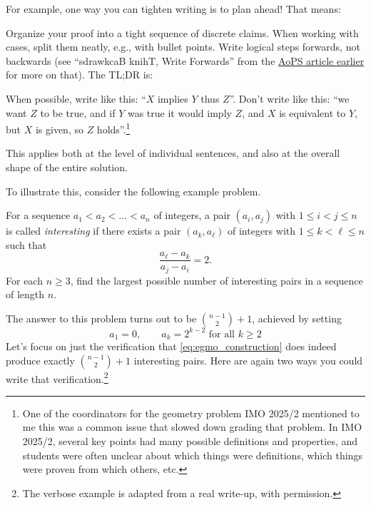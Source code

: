 \documentclass[11pt]{scrartcl}
\begin{document}
For example, one way you can tighten writing is to plan ahead! That means:
\begin{itemize}
  \ii Organize your proof into a tight sequence of discrete claims.
  \ii When working with cases, split them neatly, e.g., with bullet points.
  \ii Write logical steps forwards, not backwards
  (see ``sdrawkcaB knihT, Write Forwards'' from the
  \href{https://www.aops.com/articles/how-to-write-solution}{AoPS article earlier}
  for more on that).
  The TL;DR is:
  \begin{itemize}
    \ii When possible, write like this: ``$X$ implies $Y$ thus $Z$''.
    \ii Don't write like this: ``we want $Z$ to be true,
    and if $Y$ was true it would imply $Z$,
    and $X$ is equivalent to $Y$, but $X$ is given, so $Z$ holds''.\footnote{One
      of the coordinators for the geometry problem IMO 2025/2
      mentioned to me this was a common issue that slowed down grading that problem.
      In IMO 2025/2, several key points had many possible definitions and properties,
      and students were often unclear about which things were definitions,
      which things were proven from which others, etc.}
  \end{itemize}
  This applies both at the level of individual sentences,
  and also at the overall shape of the entire solution.
\end{itemize}
To illustrate this, consider the following example problem.
\begin{example}
  [EGMO 2024/4]
  For a sequence $a_1<a_2<\dots<a_n$ of integers,
  a pair $(a_i,a_j)$ with $1\leq i<j\leq n$ is called \emph{interesting}
  if there exists a pair $(a_k,a_\ell)$ of integers with $1\leq k<\ell\leq n$ such that
  \[ \frac{a_\ell-a_k}{a_j-a_i}=2. \]
  For each $n\geq 3$, find the largest possible number of interesting pairs
  in a sequence of length $n$.
\end{example}
The answer to this problem turns out to be $\binom{n-1}{2}+1$, achieved by setting
\begin{equation}
  a_1 = 0, \qquad a_k = 2^{k-2} \text{ for all } k \ge 2
  \label{eq:egmo_construction}
\end{equation}
Let's focus on just the verification that \eqref{eq:egmo_construction}
does indeed produce exactly $\binom{n-1}{2}+1$ interesting pairs.
Here are again two ways you could write that verification.\footnote{The
  verbose example is adapted from a real write-up, with permission.}
\end{document}
